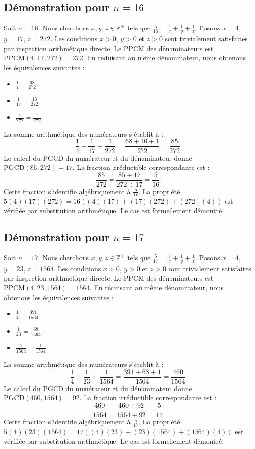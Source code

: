 \documentclass[12pt,a4paper]{article}
\begin{document}
\subsection{Démonstration pour $n = 16$}
Soit $n = 16$. Nous cherchons $x, y, z \in \mathbb{Z}^{+}$ tels que $\frac{5}{16} = \frac{1}{x} + \frac{1}{y} + \frac{1}{z}$.
Posons $x = 4$, $y = 17$, $z = 272$.
Les conditions $x > 0$, $y > 0$ et $z > 0$ sont trivialement satisfaites par inspection arithmétique directe.
Le PPCM des dénominateurs est $\text{PPCM}(4, 17, 272) = 272$.
En réduisant au même dénominateur, nous obtenons les équivalences suivantes :
\begin{itemize}
    \item $\frac{1}{4} = \frac{68}{272}$
    \item $\frac{1}{17} = \frac{16}{272}$
    \item $\frac{1}{272} = \frac{1}{272}$
\end{itemize}
La somme arithmétique des numérateurs s'établit à :
$$ \frac{1}{4} + \frac{1}{17} + \frac{1}{272} = \frac{68 + 16 + 1}{272} = \frac{85}{272} $$
Le calcul du PGCD du numérateur et du dénominateur donne $\text{PGCD}(85, 272) = 17$.
La fraction irréductible correspondante est :
$$ \frac{85}{272} = \frac{85 \div 17}{272 \div 17} = \frac{5}{16} $$
Cette fraction s'identifie algébriquement à $\frac{5}{16}$.
La propriété $5(4)(17)(272) = 16((4)(17) + (17)(272) + (272)(4))$ est vérifiée par substitution arithmétique.
Le cas est formellement démontré.

\subsection{Démonstration pour $n = 17$}
Soit $n = 17$. Nous cherchons $x, y, z \in \mathbb{Z}^{+}$ tels que $\frac{5}{17} = \frac{1}{x} + \frac{1}{y} + \frac{1}{z}$.
Posons $x = 4$, $y = 23$, $z = 1564$.
Les conditions $x > 0$, $y > 0$ et $z > 0$ sont trivialement satisfaites par inspection arithmétique directe.
Le PPCM des dénominateurs est $\text{PPCM}(4, 23, 1564) = 1564$.
En réduisant au même dénominateur, nous obtenons les équivalences suivantes :
\begin{itemize}
    \item $\frac{1}{4} = \frac{391}{1564}$
    \item $\frac{1}{23} = \frac{68}{1564}$
    \item $\frac{1}{1564} = \frac{1}{1564}$
\end{itemize}
La somme arithmétique des numérateurs s'établit à :
$$ \frac{1}{4} + \frac{1}{23} + \frac{1}{1564} = \frac{391 + 68 + 1}{1564} = \frac{460}{1564} $$
Le calcul du PGCD du numérateur et du dénominateur donne $\text{PGCD}(460, 1564) = 92$.
La fraction irréductible correspondante est :
$$ \frac{460}{1564} = \frac{460 \div 92}{1564 \div 92} = \frac{5}{17} $$
Cette fraction s'identifie algébriquement à $\frac{5}{17}$.
La propriété $5(4)(23)(1564) = 17((4)(23) + (23)(1564) + (1564)(4))$ est vérifiée par substitution arithmétique.
Le cas est formellement démontré.
\end{document}
